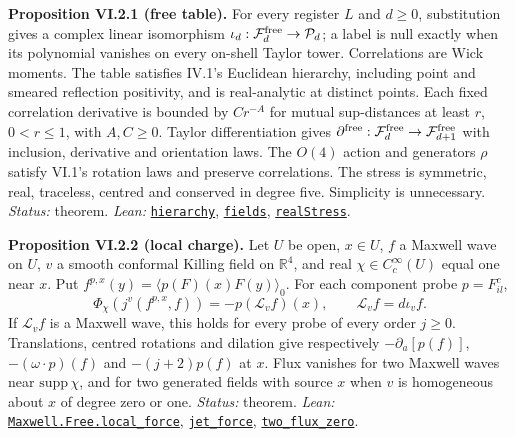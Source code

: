 \documentclass[
  letterpaper,
  11pt]{article}
\begin{document}
\textbf{Proposition VI.2.1 (free table).} For every register \(L\) and
\(d\ge0\), substitution gives a complex linear isomorphism
\(\iota_d:\mathcal F^{\rm free}_d\to\mathcal P_d\); a label is null
exactly when its polynomial vanishes on every on-shell Taylor tower.
Correlations are Wick moments. The table satisfies IV.1's Euclidean
hierarchy, including point and smeared reflection positivity, and is
real-analytic at distinct points. Each fixed correlation derivative is
bounded by \(Cr^{-A}\) for mutual sup-distances at least \(r\),
\(0<r\le1\), with \(A,C\ge0\). Taylor differentiation gives
\(\partial^{\rm free}:\mathcal F_d^{\rm free}\to\mathcal F_{d+1}^{\rm free}\)
with inclusion, derivative and orientation laws. The \(O(4)\) action and
generators \(\rho\) satisfy VI.1's rotation laws and preserve
correlations. The stress is symmetric, real, traceless, centred and
conserved in degree five. Simplicity is unnecessary. \emph{Status:}
theorem. \emph{Lean:}
\href{https://github.com/yang-mills-group/OpenAI-YM-20261028/blob/3456e5e75cf8d4cd558955a5c7638fba2d68f464/YM/Next/MAXWELL/System.lean\#L106-L114}{\texttt{hierarchy}},
\href{https://github.com/yang-mills-group/OpenAI-YM-20261028/blob/3456e5e75cf8d4cd558955a5c7638fba2d68f464/YM/Next/MAXWELL/System.lean\#L33-L35}{\texttt{fields}},
\href{https://github.com/yang-mills-group/OpenAI-YM-20261028/blob/3456e5e75cf8d4cd558955a5c7638fba2d68f464/YM/Next/MAXWELL/System.lean\#L176-L179}{\texttt{realStress}}.

\textbf{Proposition VI.2.2 (local charge).} Let \(U\) be open,
\(x\in U\), \(f\) a Maxwell wave on \(U\), \(v\) a smooth conformal
Killing field on \(\mathbb R^4\), and real \(\chi\in C_c^\infty(U)\)
equal one near \(x\). Put \(f^{p,x}(y)=\langle p(F)(x)F(y)\rangle_0\).
For each component probe \(p=F^c_{il}\),
\[\Phi_\chi(j^v(f^{p,x},f))=-p(\mathcal L_vf)(x),\qquad\mathcal L_vf=d\iota_vf.\]
If \(\mathcal L_vf\) is a Maxwell wave, this holds for every probe of
every order \(j\ge0\). Translations, centred rotations and dilation give
respectively \(-\partial_a[p(f)]\), \(-(\omega\cdot p)(f)\) and
\(-(j+2)p(f)\) at \(x\). Flux vanishes for two Maxwell waves near
\(\mathrm{supp}\,\chi\), and for two generated fields with source \(x\)
when \(v\) is homogeneous about \(x\) of degree zero or one.
\emph{Status:} theorem. \emph{Lean:}
\href{https://github.com/yang-mills-group/OpenAI-YM-20261028/blob/3456e5e75cf8d4cd558955a5c7638fba2d68f464/YM/Next/MAXWELL/Contact.lean\#L137-L156}{\texttt{Maxwell.Free.local\_force}},
\href{https://github.com/yang-mills-group/OpenAI-YM-20261028/blob/3456e5e75cf8d4cd558955a5c7638fba2d68f464/YM/Next/MAXWELL/Force.lean\#L131-L186}{\texttt{jet\_force}},
\href{https://github.com/yang-mills-group/OpenAI-YM-20261028/blob/3456e5e75cf8d4cd558955a5c7638fba2d68f464/YM/Next/MAXWELL/Repeat.lean\#L63-L128}{\texttt{two\_flux\_zero}}.
\end{document}

